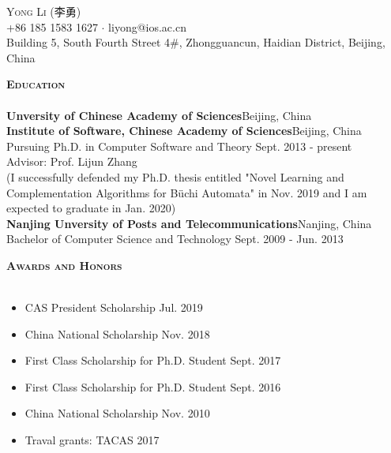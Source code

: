 \documentclass[a4paper]{article}
\newcommand{\lineunder} {
    \vspace*{-8pt} \\
    \hspace*{-18pt} \hrulefill \\
}
\newcommand{\header} [1] {
    {\hspace*{-18pt}\vspace*{6pt} \textsc{#1}}
    \vspace*{-6pt} \lineunder
}
\begin{document}
\begin{CJK*}{UTF8}{gkai}
\vspace*{-40pt}

    

\vspace*{-10pt}

\begin{center}
	{\Huge \scshape {Yong Li (李勇)}}\\
	\bigskip 
	+86 185 1583 1627 $\cdot$ liyong@ios.ac.cn\\
	Building 5, South Fourth Street 4\#,
Zhongguancun, Haidian District, Beijing, China\\
\end{center}

\header{\textbf{Education}}

\textbf{Unversity of Chinese Academy of Sciences}\hfill Beijing, China\\
\textbf{Institute of Software, Chinese Academy of Sciences}\hfill Beijing, China\\

Pursuing Ph.D. in Computer Software and Theory \hfill Sept. 2013 - present \\
Advisor: Prof. Lijun Zhang \\
(I successfully defended my Ph.D. thesis entitled "Novel Learning and Complementation Algorithms for B\"uchi Automata" in Nov. 2019 and I am expected to graduate in Jan. 2020)\\
\bigskip
\textbf{Nanjing Unversity of Posts and Telecommunications}\hfill Nanjing, China\\
Bachelor of Computer Science and Technology \hfill Sept. 2009 - Jun. 2013 \\
\vspace{2mm}



\header{\textbf{Awards and Honors}}

\begin{itemize}
\item CAS President Scholarship \hfill Jul. 2019
\item China National Scholarship \hfill Nov. 2018
\item First Class Scholarship for Ph.D. Student \hfill Sept. 2017
\item First Class Scholarship for Ph.D. Student \hfill Sept. 2016
\item China National Scholarship \hfill Nov. 2010
\item Traval grants: TACAS 2017
\end{itemize}




\end{CJK*}
\end{document}
